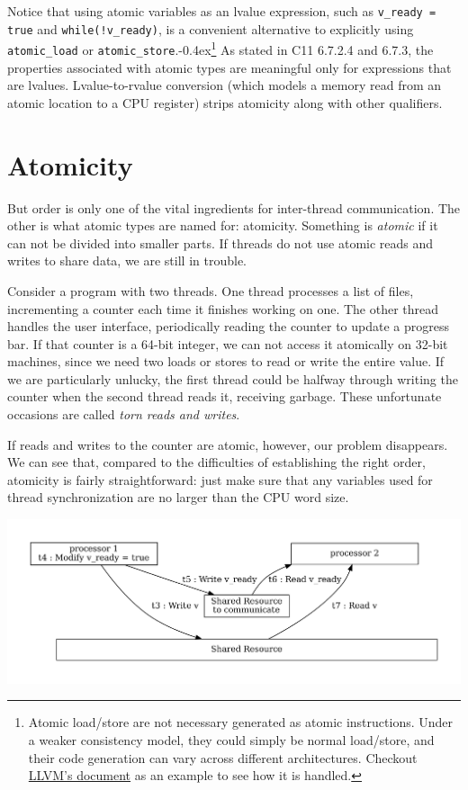\documentclass[fontsize=10pt, oneside]{scrartcl}
\newcommand{\punckern}{\kern-0.4ex}
\newcommand{\monobox}[1]{\mbox{\texttt{#1}}}
\newcommand{\introduce}[1]{\textit{#1}}
\begin{document}
Notice that using atomic variables as an lvalue expression, such as \monobox{v\_ready = true} and \monobox{while(!v\_ready)}, is a convenient alternative to explicitly using \monobox{atomic\_load} or \monobox{atomic\_store}.\punckern\footnote{%
Atomic load/store are not necessary generated as atomic instructions.
Under a weaker consistency model, they could simply be normal load/store,
and their code generation can vary across different architectures.
Checkout \href{https://llvm.org/docs/Atomics.html\#atomics-and-codegen}{LLVM's document} as an example to see how it is handled.}
As stated in C11 6.7.2.4 and 6.7.3, the properties associated with atomic types are meaningful only for expressions that are
lvalues.
Lvalue-to-rvalue conversion (which models a memory read from an atomic location to a CPU register) strips atomicity along with other qualifiers.

\section{Atomicity}
\label{atomicity}
But order is only one of the vital ingredients for inter-thread communication.
The other is what atomic types are named for: atomicity.
Something is \introduce{atomic} if it can not be divided into smaller parts.
If threads do not use atomic reads and writes to share data, we are still in trouble.

Consider a program with two threads.
One thread processes a list of files, incrementing a counter each time it finishes working on one.
The other thread handles the user interface, periodically reading the counter to update a progress bar.
If that counter is a 64-bit integer, we can not access it atomically on 32-bit machines,
since we need two loads or stores to read or write the entire value.
If we are particularly unlucky, the first thread could be halfway through writing the counter when the second thread reads it,
receiving garbage.
These unfortunate occasions are called \introduce{torn reads and writes}.

If reads and writes to the counter are atomic, however, our problem disappears.
We can see that, compared to the difficulties of establishing the right order,
atomicity is fairly straightforward:
just make sure that any variables used for thread synchronization
are no larger than the \textsc{CPU} word size.

\includegraphics[keepaspectratio, width=0.8\linewidth]{images/atomicity}
\label{fig:atomicity}
\end{document}
